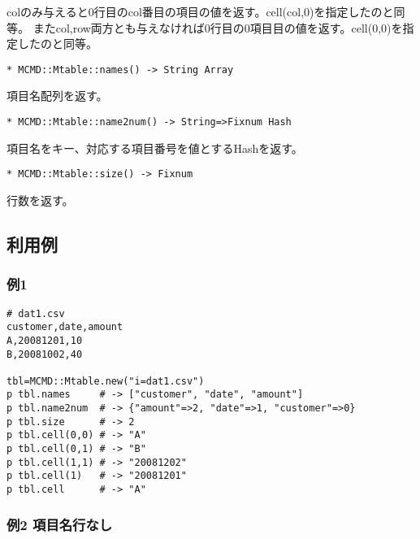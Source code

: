 colのみ与えると0行目のcol番目の項目の値を返す。cell(col,0)を指定したのと同等。
またcol,row両方とも与えなければ0行目の0項目目の値を返す。cell(0,0)を指定したのと同等。

{\Large
\begin{verbatim}
* MCMD::Mtable::names() -> String Array
\end{verbatim}
}

項目名配列を返す。

{\Large
\begin{verbatim}
* MCMD::Mtable::name2num() -> String=>Fixnum Hash
\end{verbatim}
}

項目名をキー、対応する項目番号を値とするHashを返す。

{\Large
\begin{verbatim}
* MCMD::Mtable::size() -> Fixnum
\end{verbatim}
}

行数を返す。


\subsection{利用例}
\subsubsection*{例1}

\begin{Verbatim}[baselinestretch=0.7,frame=single]
# dat1.csv
customer,date,amount
A,20081201,10
B,20081002,40

tbl=MCMD::Mtable.new("i=dat1.csv")
p tbl.names     # -> ["customer", "date", "amount"]
p tbl.name2num  # -> {"amount"=>2, "date"=>1, "customer"=>0}
p tbl.size      # -> 2
p tbl.cell(0,0) # -> "A"
p tbl.cell(0,1) # -> "B"
p tbl.cell(1,1) # -> "20081202"
p tbl.cell(1)   # -> "20081201"
p tbl.cell      # -> "A"
\end{Verbatim}

\subsubsection*{例2 項目名行なし}

